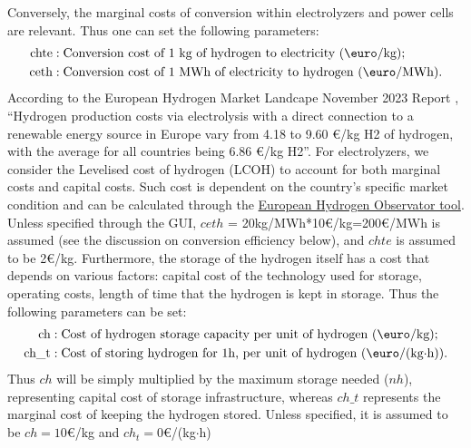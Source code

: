\documentclass[english]{article}
\numberwithin{definition}{section}
\numberwithin{theorem}{section}
\numberwithin{problem}{section}
\begin{document}
Conversely, the marginal costs of conversion within electrolyzers and power cells are relevant. Thus one can set the following parameters:
\begin{align*}
    \text{chte} & : \text{Conversion cost of 1 kg of hydrogen to electricity (\euro/kg);} \\
    \text{ceth} & : \text{Conversion cost of 1 MWh of electricity to hydrogen (\euro/MWh).}
\end{align*}
According to the European Hydrogen Market Landcape November 2023 Report  \cite{European_H2_Market_landscape},
 ``Hydrogen production costs via electrolysis with a direct connection to a 
 renewable energy source in Europe vary from 4.18 to 9.60 €/kg H2 of hydrogen, with the average
  for all countries being 6.86 €/kg H2''. For electrolyzers, we consider the Levelised cost of hydrogen (LCOH)
   to account for both marginal costs and capital costs. Such cost is dependent on the country's specific market
    condition and can be calculated through the \href{https://observatory.clean-hydrogen.europa.eu/tools-reports/levelised-cost-hydrogen-calculator}{European Hydrogen Observator tool}. Unless specified through the GUI, $ceth$ = 20kg/MWh*10\euro/kg=200\euro/MWh is assumed (see the discussion on conversion efficiency below), and $chte$ is assumed to be 2\euro/kg. 
Furthermore, the storage of the hydrogen itself has a cost that depends on various factors: capital cost of the technology used for storage, operating costs, length of time that the hydrogen is kept in storage. Thus the following parameters can be set:
\begin{align*}
    \text{ch} & : \text{Cost of hydrogen storage capacity per unit of hydrogen (\euro/kg);} \\
    \text{ch\_t} & : \text{Cost of storing hydrogen for 1h, per unit of hydrogen (\euro/(kg$\cdot$h)).}
\end{align*}
Thus $ch$ will be simply multiplied by the maximum storage needed ($nh$), representing capital
 cost of storage infrastructure, whereas $ch\_t$ represents the marginal cost of keeping the
  hydrogen stored.  Unless specified, it is assumed to be $ch=10$\euro/kg and $ch_t=0$\euro/(kg$\cdot$h)
\end{document}
